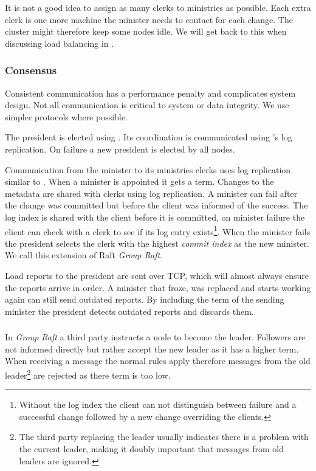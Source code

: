 It is not a good idea to assign as many clerks to ministries as possible. Each extra clerk is one more machine the minister needs to contact for each change. The cluster might therefore keep some nodes idle. We will get back to this when discussing load balancing in .
%
\subsubsection*{Consensus} \label{sec:concensus} \label{sec:praft}
Consistent communication has a performance penalty and complicates system design. Not all communication is critical to system or data integrity. We use simpler protocols where possible. 

The president is elected using \raft{}. Its coordination is communicated using \raft{}'s log replication. On failure a new president is elected by all nodes.

Communication from the minister to its ministries clerks uses log replication similar to \raft{}. When a minister is appointed it gets a \raft{} term. Changes to the metadata are shared with clerks using log replication. A minister can fail after the change was committed but before the client was informed of the success. The log index is shared with the client before it is committed, on minister failure the client can check with a clerk to see if its log entry exists\footnote{Without the log index the client can not distinguish between failure and a successful change followed by a new change overriding the clients.}. When the minister fails the president selects the clerk with the highest \textsl{commit index} as the new minister. We call this extension of Raft \textit{Group Raft}.

Load reports to the president are sent over TCP, which will almost always ensure the reports arrive in order. A minister that froze, was replaced and starts working again can still send outdated reports. By including the term of the sending minister the president detects outdated reports and discards them.
%
\subsubsection*{\graft{}} \label{sec:dictraft}
In \textit{Group Raft} a third party instructs a node to become the leader. Followers are not informed directly but rather accept the new leader as it has a higher term. When receiving a message the normal \raft{} rules apply therefore messages from the old leader\footnote{The third party replacing the leader usually indicates there is a problem with the current leader, making it doubly important that messages from old leaders are ignored.} are rejected as there term is too low.

